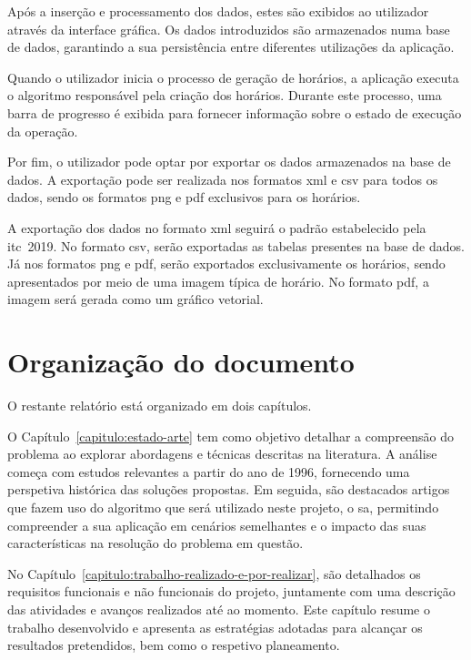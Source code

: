 Após a inserção e processamento dos dados, estes são exibidos ao utilizador através da interface gráfica. Os dados introduzidos são armazenados numa base de dados, garantindo a sua persistência entre diferentes utilizações da aplicação.

Quando o utilizador inicia o processo de geração de horários, a aplicação executa o algoritmo responsável pela criação dos horários. Durante este processo, uma barra de progresso é exibida para fornecer informação sobre o estado de execução da operação.


Por fim, o utilizador pode optar por exportar os dados armazenados na base de dados. A exportação pode ser realizada nos formatos \gls{xml} e \gls{csv} para todos os dados, sendo os formatos \gls{png} e \gls{pdf} exclusivos para os horários.

A exportação dos dados no formato \gls{xml} seguirá o padrão estabelecido pela \gls{itc}~2019. No formato \gls{csv}, serão exportadas as tabelas presentes na base de dados. Já nos formatos \gls{png} e \gls{pdf}, serão exportados exclusivamente os horários, sendo apresentados por meio de uma imagem típica de horário. No formato \gls{pdf}, a imagem será gerada como um gráfico vetorial.

\section{Organização do documento}

O restante relatório está organizado em dois capítulos.

O Capítulo~\ref{capitulo:estado-arte} tem como objetivo detalhar a compreensão do problema ao explorar abordagens e técnicas descritas na literatura. A análise começa com estudos relevantes a partir do ano de 1996, fornecendo uma perspetiva histórica das soluções propostas. Em seguida, são destacados artigos que fazem uso do algoritmo que será utilizado neste projeto, o \gls{sa}, permitindo compreender a sua aplicação em cenários semelhantes e o impacto das suas características na resolução do problema em questão.

No Capítulo~\ref{capitulo:trabalho-realizado-e-por-realizar}, são detalhados os requisitos funcionais e não funcionais do projeto, juntamente com uma descrição das atividades e avanços realizados até ao momento. Este capítulo resume o trabalho desenvolvido e apresenta as estratégias adotadas para alcançar os resultados pretendidos, bem como o respetivo planeamento.
